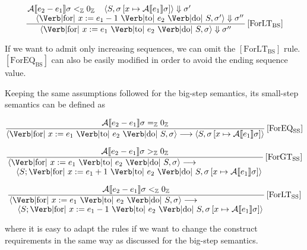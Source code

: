 \documentclass{article}
\begin{document}
\begin{enumerate}[2.]
    $$
    \frac
      {\splitfrac{
        \mathcal{A}\llbracket e_2 - e_1 \rrbracket \sigma 
        <_\mathbb{Z} 0_\mathbb{Z} \;\;\;\;
        \langle 
          S, 
          \sigma
          \left[
            x \mapsto \mathcal{A} 
              \llbracket e_1 \rrbracket \sigma
          \right] 
        \rangle \Downarrow \sigma'
      }
      {
        \langle
           \text{\Verb|for| } x:= e_1 - 1 \text{ \Verb|to| } e_2
            \text{ \Verb|do| } S,
          \sigma'
        \rangle \Downarrow \sigma''
      }
      }
      {
        \langle 
          \text{\Verb|for| } x:= e_1 \text{ \Verb|to| } e_2
            \text{ \Verb|do| } S,
          \sigma
        \rangle \Downarrow \sigma''
      }
    \left[\text{ForLT}_\text{BS}\right]
    $$

    If we want to admit only increasing sequences, we can omit the 
    $[\text{ForLT}_\text{BS}]$ rule. $[\text{ForEQ}_\text{BS}]$
    can also be easily modified in order to avoid the ending sequence
    value.

    Keeping the same assumptions followed for the big-step semantics,
    its small-step semantics can be defined as

    $$
    \frac
      {
        \mathcal{A}\llbracket e_2 - e_1 \rrbracket \sigma 
        =_\mathbb{Z} 0_\mathbb{Z} 
      }
      {
        \langle 
          \text{\Verb|for| } x:= e_1 \text{ \Verb|to| } e_2
            \text{ \Verb|do| } S,
          \sigma
        \rangle \longrightarrow
        \langle
          S,
          \sigma
          \left[
            x \mapsto \mathcal{A} 
              \llbracket e_1 \rrbracket \sigma
          \right] 
        \rangle
      }
    \left[\text{ForEQ}_\text{SS}\right]
    $$

    $$
    \frac
      {
        \mathcal{A}\llbracket e_2 - e_1 \rrbracket \sigma 
        >_\mathbb{Z} 0_\mathbb{Z}
      }
      {\splitfrac{
        \langle 
          \text{\Verb|for| } x:= e_1 \text{ \Verb|to| } e_2
            \text{ \Verb|do| } S,
          \sigma
        \rangle \longrightarrow
      }
      {
        \langle 
          S;\text{\Verb|for| } x:= e_1 + 1 
            \text{ \Verb|to| } e_2
            \text{ \Verb|do| } S,
          \sigma
          \left[
            x \mapsto \mathcal{A} 
              \llbracket e_1 \rrbracket \sigma
          \right] 
        \rangle 
      }
      }
    \left[\text{ForGT}_\text{SS}\right]
    $$

    $$
    \frac
      {
        \mathcal{A}\llbracket e_2 - e_1 \rrbracket \sigma 
        <_\mathbb{Z} 0_\mathbb{Z}
      }
      {\splitfrac{
        \langle 
          \text{\Verb|for| } x:= e_1 \text{ \Verb|to| } e_2
            \text{ \Verb|do| } S,
          \sigma
        \rangle \longrightarrow
      }
      {
        \langle 
          S;\text{\Verb|for| } x:= e_1 - 1 
            \text{ \Verb|to| } e_2
            \text{ \Verb|do| } S,
          \sigma
          \left[
            x \mapsto \mathcal{A} 
              \llbracket e_1 \rrbracket \sigma
          \right] 
        \rangle 
      }
      }
    \left[\text{ForLT}_\text{SS}\right]
    $$

    where it is easy to adapt the rules if we want to change
    the construct requirements in the same way as discussed 
    for the big-step semantics.
\end{enumerate}
\end{document}
